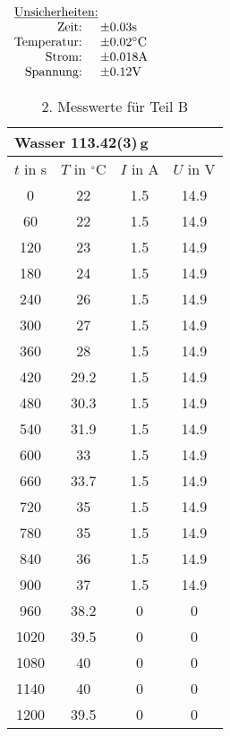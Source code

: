 \documentclass[11pt,a4paper]{article}
\begin{document}
\begin{table}[h]
\centering
$\begin{array}{rl}
\multicolumn{2}{l}{\textrm{\underline{Unsicherheiten:}}}\\
\textrm{Zeit: } & \pm 0.03 \textrm{s}\\
\textrm{Temperatur: } & \pm 0.02 \textrm{\celsius}\\
\textrm{Strom: } & \pm 0.018 \textrm{A}\\
\textrm{Spannung: } & \pm 0.12 \textrm{V}
\end{array}$
\begin{tabular}{|c|c|c|c|}
\multicolumn{4}{l}{Wasser 113.42(3)\,g}\\
\hline
$t$ in s & $T$ in $^\circ\textrm{C}$ & $I$ in A & $U$ in V \\
\hline 
0   & 22 & 1.5 & 14.9\\
60  & 22 & 1.5 & 14.9\\
120 & 23 & 1.5 & 14.9\\
180 & 24 & 1.5 & 14.9\\
240 & 26 & 1.5 & 14.9\\ 
300 & 27 & 1.5 & 14.9\\ 
360 & 28 & 1.5 & 14.9\\ 
420 & 29.2 & 1.5 & 14.9\\ 
480 & 30.3 & 1.5 & 14.9\\ 
540 & 31.9 & 1.5 & 14.9\\ 
600 & 33 & 1.5 & 14.9\\ 
660 & 33.7 & 1.5 & 14.9\\ 
720 & 35 & 1.5 & 14.9\\ 
780 & 35 & 1.5 & 14.9\\ 
840 & 36 & 1.5 &14.9\\
900 & 37 & 1.5 & 14.9\\
960 & 38.2 & 0 & 0\\
1020 & 39.5 & 0 & 0\\
1080 & 40 & 0 & 0\\
1140 & 40 & 0 & 0\\
1200 & 39.5 & 0 & 0\\
\hline
\end{tabular}
\renewcommand\thetable{T5}
\caption{2. Messwerte für Teil B}
\label{tab:B2}
\end{table}

\pagebreak

\pagebreak
\phantom{lol}
\end{document}
